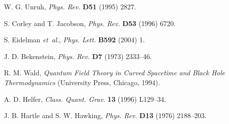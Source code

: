 \documentclass[12pt]{article}
\begin{document}
\begin{thebibliography}{99}
W. G. Unruh, {\em Phys. Rev.} {\bf D51} (1995) 2827.

S. Corley and T. Jacobson, {\em Phys. Rev.} {\bf D53} 
(1996) 6720.


S. Eidelman {\em et~al.}, 
{\em Phys. Lett.} {\bf B592} (2004) 1.

J. D. Bekenstein, {\em Phys. Rev.} {\bf D7} (1973)
2333--46.








R. M. Wald, {\em Quantum Field Theory in Curved
Spacetime and Black Hole Thermodynamics} 
(University Press, Chicago, 1994).


A. D. Helfer, {\em Class. Quant. Grav.} {\bf 13}
(1996) L129--34.

J. B. Hartle and S. W. Hawking, {\em Phys. Rev.} {\bf D13} (1976)
2188--203.


\end{thebibliography}
\end{document}
